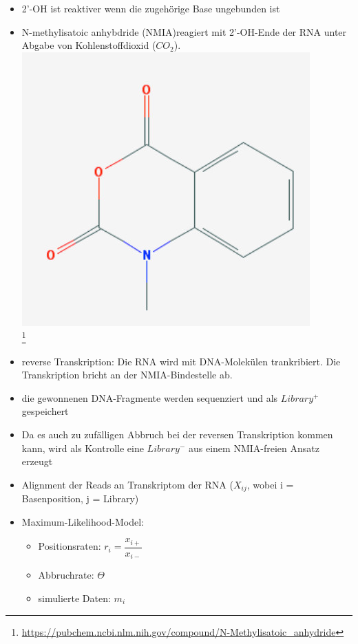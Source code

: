 \begin{itemize}
\item 2'-OH ist reaktiver wenn die zugehörige Base ungebunden ist
\item N-methylisatoic anhybdride (NMIA)reagiert mit 2'-OH-Ende der RNA unter Abgabe von Kohlenstoffdioxid ($CO_2$). \\
\includegraphics[scale=0.5]{lectures/160527/pix/NMIA.jpg} \\
\footnote{\url{https://pubchem.ncbi.nlm.nih.gov/compound/N-Methylisatoic_anhydride}} \\

\item reverse Transkription: Die RNA wird mit DNA-Molekülen trankribiert. Die Transkription bricht an der NMIA-Bindestelle ab.
\item die gewonnenen DNA-Fragmente werden sequenziert und als $Library^+$ gespeichert
\item Da es auch zu zufälligen Abbruch bei der reversen Transkription kommen kann, wird als Kontrolle eine $Library^-$ aus einem NMIA-freien Ansatz erzeugt
\item Alignment der Reads an Transkriptom der RNA ($X_{ij}$, wobei i = Basenposition, j = Library)

\item Maximum-Likelihood-Model:

\begin{itemize}
\item Positionsraten: $r_i = \dfrac{x_{i+}}{x_{i-}}$
\item Abbruchrate: $\Theta$
\item simulierte Daten: $m_i$ 
\end{itemize}


\end{itemize}
